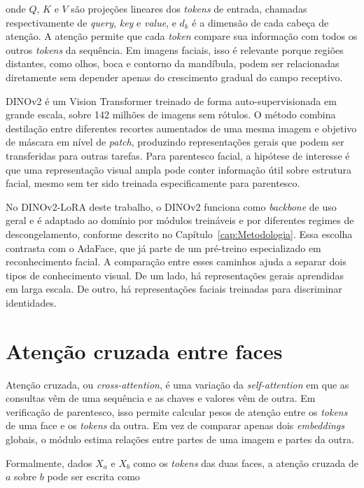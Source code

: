 onde $Q$, $K$ e $V$ são projeções lineares dos \textit{tokens} de entrada, chamadas respectivamente de \textit{query}, \textit{key} e \textit{value}, e $d_k$ é a dimensão de cada cabeça de atenção. A atenção permite que cada \textit{token} compare sua informação com todos os outros \textit{tokens} da sequência. Em imagens faciais, isso é relevante porque regiões distantes, como olhos, boca e contorno da mandíbula, podem ser relacionadas diretamente sem depender apenas do crescimento gradual do campo receptivo.

DINOv2 \cite{oquab2024dinov2}
é um Vision Transformer treinado de forma auto-supervisionada em grande escala, sobre 142 milhões de imagens sem rótulos. O método combina destilação entre diferentes recortes aumentados de uma mesma imagem e objetivo de máscara em nível de \textit{patch}, produzindo representações gerais que podem ser transferidas para outras tarefas. Para parentesco facial, a hipótese de interesse é que uma representação visual ampla pode conter informação útil sobre estrutura facial, mesmo sem ter sido treinada especificamente para parentesco.

No DINOv2-LoRA deste trabalho, o DINOv2 funciona como \textit{backbone} de uso geral e é adaptado ao domínio por módulos treináveis e por diferentes regimes de descongelamento, conforme descrito no Capítulo~\ref{cap:Metodologia}. Essa escolha contrasta com o AdaFace, que já parte de um pré-treino especializado em reconhecimento facial. A comparação entre esses caminhos ajuda a separar dois tipos de conhecimento visual. De um lado, há representações gerais aprendidas em larga escala. De outro, há representações faciais treinadas para discriminar identidades.

\section{Atenção cruzada entre faces}

Atenção cruzada, ou \textit{cross-attention}, é uma variação da \textit{self-attention} em que as consultas vêm de uma sequência e as chaves e valores vêm de outra. Em verificação de parentesco, isso permite calcular pesos de atenção entre os \textit{tokens} de uma face e os \textit{tokens} da outra. Em vez de comparar apenas dois \textit{embeddings} globais, o módulo estima relações entre partes de uma imagem e partes da outra.

Formalmente, dados $X_a$ e $X_b$ como os \textit{tokens} das duas faces, a atenção cruzada de $a$ sobre $b$ pode ser escrita como

